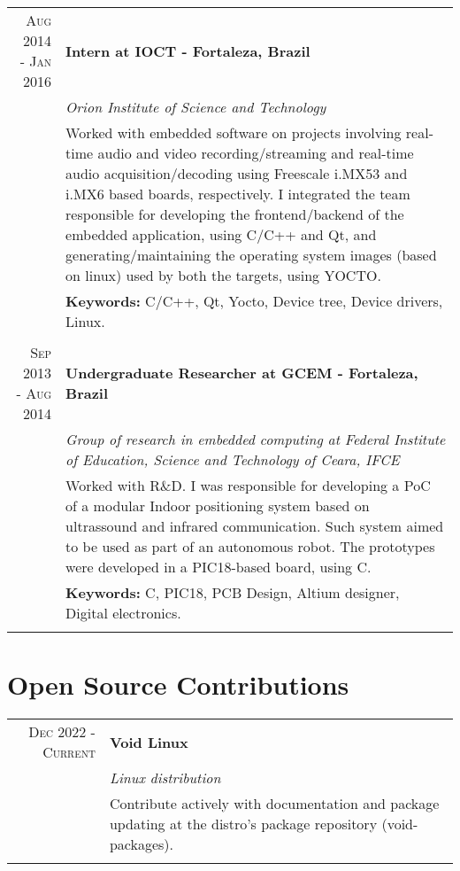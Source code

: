 \documentclass[a4paper,10pt]{article}
\begin{document}
\begin{tabular}{r|p{11cm}}
\textsc{Aug 2014 - Jan 2016} & \textbf{Intern at IOCT - Fortaleza, Brazil}\\&\emph{Orion Institute of Science and Technology}\\&\footnotesize{Worked with embedded software on projects involving real-time audio and video recording/streaming and real-time audio acquisition/decoding using Freescale i.MX53 and i.MX6 based boards, respectively. I integrated the team responsible for developing the frontend/backend of the embedded application, using C/C++ and Qt, and generating/maintaining the operating system images (based on linux) used by both the targets, using YOCTO.}
\\ & \footnotesize{\textbf{Keywords:} C/C++, Qt, Yocto, Device tree, Device drivers, Linux.}
\\\multicolumn{2}{c}{} \\

\textsc{Sep 2013 - Aug 2014} & \textbf{Undergraduate Researcher at GCEM - Fortaleza, Brazil} \\&\emph{Group of research in embedded computing at Federal Institute of Education,
Science and Technology of Ceara, IFCE}\\&\footnotesize{Worked with R\&D. I was responsible for developing a PoC of a modular Indoor positioning system based on ultrassound and infrared communication. Such system aimed to be used as part of an autonomous robot. The prototypes were developed in a PIC18-based board, using C.}
\\ & \footnotesize{\textbf{Keywords:} C, PIC18, PCB Design, Altium designer, Digital electronics.}
\\\multicolumn{2}{c}{}

\end{tabular}

\section{Open Source Contributions}
\begin{tabular}{r|p{11cm}}
\textsc{Dec 2022 - Current} & \textbf{Void Linux} \\&\emph{Linux distribution}
  \\&\footnotesize{Contribute actively with documentation and package updating at the distro's package repository (void-packages).}
\\\multicolumn{2}{c}{}
\end{tabular}
\end{document}

